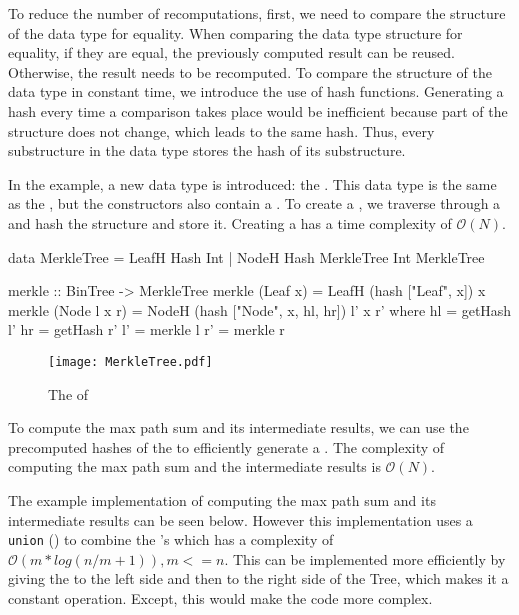 To reduce the number of recomputations, first, we need to compare the structure of the data type for equality. When comparing the data type structure for equality, if they are equal, the previously computed result can be reused. Otherwise, the result needs to be recomputed. To compare the structure of the data type in constant time, we introduce the use of hash functions. Generating a hash every time a comparison takes place would be inefficient because part of the structure does not change, which leads to the same hash. Thus, every substructure in the data type stores the hash of its substructure. 

In the example, a new data type is introduced: the . This data type is the same as the , but the constructors also contain a . To create a , we traverse through a  and hash the structure and store it. Creating a  has a time complexity of $\mathcal{O}(N)$.

\begin{haskell}
data MerkleTree = LeafH Hash Int
                | NodeH Hash MerkleTree Int MerkleTree

merkle :: BinTree -> MerkleTree
merkle (Leaf x)     = LeafH (hash ["Leaf", x]) x
merkle (Node l x r) = NodeH (hash ["Node", x, hl, hr]) l' x r'
  where
    hl = getHash l'
    hr = getHash r'
    l' = merkle l
    r' = merkle r
\end{haskell}

\begin{figure}[H]
    \centering
    \texttt{[image: MerkleTree.pdf]}
    \caption{The  of }
\end{figure}

To compute the max path sum and its intermediate results, we can use the precomputed hashes of the  to efficiently generate a . The complexity of computing the max path sum and the intermediate results is $\mathcal{O}(N)$.   

The example implementation of computing the max path sum and its intermediate results can be seen below. However this implementation uses a \texttt{union} (\inlinehaskell{<>}) to combine the 's which has a complexity of $\mathcal{O}(m*log(n/m + 1)), m <= n$. This can be implemented more efficiently by giving the  to the left side and then to the right side of the Tree, which makes it a constant operation. Except, this would make the code more complex. 

